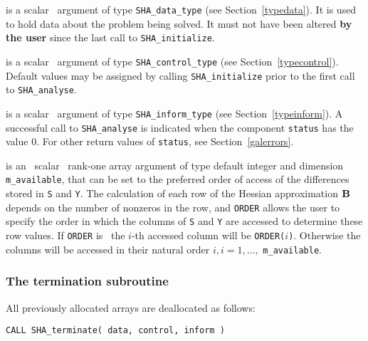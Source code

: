 \documentclass{galahad}
\newcommand{\packagename}{SHA}
\begin{document}
\begin{description}
 is a scalar \intentinout\ argument of type 
{\tt \packagename\_data\_type}
(see Section~\ref{typedata}). It is used to hold data about the problem being 
solved. It must not have been altered {\bf by the user} since the last call to 
{\tt \packagename\_initialize}.

 is a scalar \intentin\ argument of type 
{\tt \packagename\_control\_type}
(see Section~\ref{typecontrol}). Default values may be assigned by calling 
{\tt \packagename\_initialize} prior to the first call to 
{\tt \packagename\_analyse}. 

 is a scalar \intentinout\ argument of type 
{\tt \packagename\_inform\_type}
(see Section~\ref{typeinform}). 
A successful call to
{\tt \packagename\_analyse}
is indicated when the  component {\tt status} has the value 0. 
For other return values of {\tt status}, see Section~\ref{galerrors}.

 is an \optional\ scalar \intentin\ rank-one array argument 
of type default integer and dimension {\tt m\_available}, that can be set
to the preferred order of access of the differences stored 
in {\tt S} and {\tt Y}. The calculation of each row of the 
Hessian approximation ${\mathbf{B}}$ depends on the number of nonzeros in the row,
and {\tt ORDER} allows the user to specify the order in which the columns
of  {\tt S} and {\tt Y} are accessed to determine these row values. 
If {\tt ORDER} is \present\, the $i$-th accessed column will be
{\tt ORDER(}$i${\tt )}. Otherwise the columns will be accessed
in their natural order $i, i = 1, \ldots ,$ {\tt m\_available}.

\end{description}


\subsubsection{The  termination subroutine}
All previously allocated arrays are deallocated as follows:
\vspace*{1mm}

\hspace{8mm}
{\tt CALL \packagename\_terminate( data, control, inform )}
\end{document}
